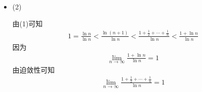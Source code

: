 \documentclass{article}
\begin{document}
\begin{itemize}
  \item (2)

        由(1)可知
        \begin{align*}
          1 = \frac{\ln n}{\ln n} < \frac{\ln (n + 1)}{\ln n} < \frac{1 + \frac{1}{2} + \cdots + \frac{1}{n}}{\ln n} < \frac{1 + \ln n}{\ln n}
        \end{align*}
        因为
        \begin{align*}
          \lim\limits_{n \to \infty} \frac{1 + \ln n}{\ln n} = 1
        \end{align*}
        由迫敛性可知
        \begin{align*}
          \lim\limits_{n \to \infty} \frac{1 + \frac{1}{2} + \cdots + \frac{1}{n}}{\ln n} = 1
        \end{align*}

\end{itemize}
\end{document}
